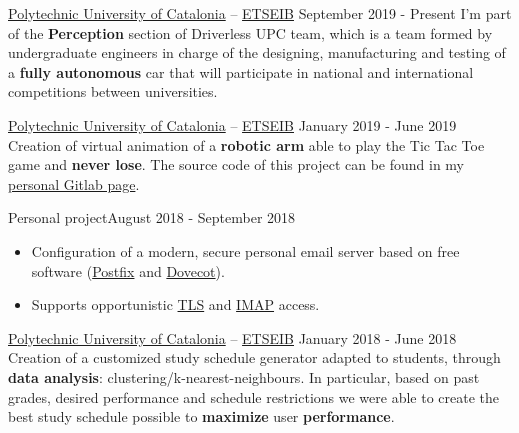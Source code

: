 \documentclass[10pt, a4paper, ragged2e]{../altacv}
\begin{document}
{\href{https://www.upc.edu/en}{Polytechnic University of Catalonia} --
\href{https://etseib.upc.edu/en}{ETSEIB}}
{September 2019 - Present}{}
I'm part of the \textbf{Perception} section of Driverless UPC team, which is a
team formed by undergraduate engineers in charge of the designing, manufacturing
and testing of a \textbf{fully autonomous} car that will participate in national
and international competitions between universities.

\divider

{\href{https://www.upc.edu/en}{Polytechnic University of Catalonia} --
\href{https://etseib.upc.edu/en}{ETSEIB}}
{January 2019 - June 2019}{}
Creation of virtual animation of a \textbf{robotic arm} able to play the Tic
Tac Toe game and \textbf{never lose}. The source code of this project can be
found in my \href{https://gitlab.com/DavidAlvarez/}{personal Gitlab
  page\footnotemark}.

\divider

{Personal project}{August 2018 - September 2018}{}
\begin{itemize}
  \item Configuration of a modern, secure personal email server based on
  free software (\href{http://www.postfix.org/}{Postfix} and
  \href{https://www.dovecot.org/}{Dovecot}).
  \item Supports opportunistic
  \href{https://en.wikipedia.org/wiki/Transport_Layer_Security}{TLS} and
  \href{https://en.wikipedia.org/wiki/Internet_Message_Access_Protocol}
  {IMAP} access.
\end{itemize}

\divider

{\href{https://www.upc.edu/en}{Polytechnic University of Catalonia} --
\href{https://etseib.upc.edu/en}{ETSEIB}}
{January 2018 - June 2018}{}
Creation of a customized study schedule generator adapted to students, through
\textbf{data analysis}: clustering/k-nearest-neighbours. In particular, based on
past grades, desired performance and schedule restrictions we were able to
create the best study schedule possible to \textbf{maximize} user
\textbf{performance}.

\medskip


\end{document}

